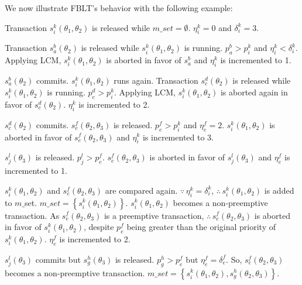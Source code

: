 \documentclass[a4paper,english]{article}
\begin{document}
We now illustrate FBLT's behavior with the following example:
\begin{compactenum}
\item Transaction $s_{i}^{k}(\theta_{1},\theta_{2})$ is released while
$m\_set=\emptyset$. $\eta_{i}^{k}=0$ and $\delta_{i}^{k}=3$.
\item \label{fblt_ex_step 2} Transaction $s_{a}^{b}(\theta_{2})$ is released
while $s_{i}^{k}(\theta_{1},\theta_{2})$ is running. $p_{a}^{b}>p_{i}^{k}$
and $\eta_{i}^{k}<\delta_{i}^{k}$. Applying LCM, $s_{i}^{k}(\theta_{1},\theta_{2})$
is aborted in favor of $s_{a}^{b}$ and $\eta_{i}^{k}$ is incremented
to 1.
\item $s_{a}^{b}(\theta_{2})$ commits. $s_{i}^{k}(\theta_{1},\theta_{2})$
runs again. Transaction $s_{c}^{d}(\theta_{2})$ is released while
$s_{i}^{k}(\theta_{1},\theta_{2})$ is running. $p_{c}^{d}>p_{i}^{k}$. Applying LCM, $s_{i}^{k}(\theta_{1},\theta_{2})$ is aborted again in favor of $s_{c}^{d}(\theta_{2})$.
$\eta_{i}^{k}$ is incremented to 2.
\item $s_{c}^{d}(\theta_{2})$ commits. $s_{e}^{f}(\theta_{2},\theta_{3})$
is released. $p_{e}^{f}>p_{i}^{k}$ and $\eta_{e}^{f}=2$. $s_{i}^{k}(\theta_{1},\theta_{2})$
is aborted in favor of $s_{e}^{f}(\theta_{2},\theta_{3})$ and $\eta_{i}^{k}$
is incremented to 3.
\item $s_{j}^{l}(\theta_{3})$ is released. $p_{j}^{l}>p_{e}^{f}$. $s_{e}^{f}(\theta_{2},\theta_{3})$ is aborted in favor of $s_{j}^{l}(\theta_{3})$
and $\eta_{e}^{f}$ is incremented to 1.
\item \label{fblt_ex_step 6} $s_{i}^{k}(\theta_{1},\theta_{2})$ and $s_{e}^{f}(\theta_{2},\theta_{3})$
are compared again. $\because\,\eta_{i}^{k}=\delta_{i}^{k}$, $\therefore\, s_{i}^{k}(\theta_{1},\theta_{2})$
is added to $m\_$set. $m\_set=\left\{ s_{i}^{k}(\theta_{1},\theta_{2})\right\} $.
$s_{i}^{k}(\theta_{1},\theta_{2})$ becomes a non-preemptive transaction.
As $s_{e}^{f}(\theta_{2},\theta_{3})$ is a preemptive transaction, $\therefore\, s_{e}^{f}(\theta_{2},\theta_{3})$ is aborted in
favor of $s_{i}^{k}(\theta_{1},\theta_{2})$, despite $p_{e}^{f}$ being greater than the original priority of $s_i^k(\theta_1,\theta_2)$. $\eta_{e}^{f}$ is incremented to 2.
%
\item \label{fblt_ex_step 7} $s_{j}^{l}(\theta_{3})$ commits but $s_{g}^{h}(\theta_{3})$
is released. $p_{g}^{h}>p_{e}^{f}$ but $\eta_{e}^{f}=\delta_{e}^{f}$.
So, $s_{e}^{f}(\theta_{2},\theta_{3})$ becomes a non-preemptive transaction.
$m\_set=\left\{ s_{i}^{k}(\theta_{1},\theta_{2}),s_{g}^{h}(\theta_{2},\theta_{3})\right\} $.

\end{compactenum}
\end{document}
